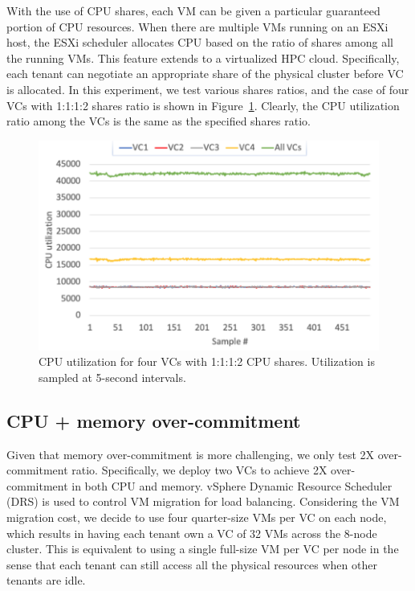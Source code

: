 With the use of CPU shares, each VM can be given a particular guaranteed portion of CPU resources. When there are multiple VMs running on an ESXi host, the ESXi scheduler allocates CPU based on the ratio of shares among all the running VMs. This feature extends to a virtualized HPC cloud. Specifically, each tenant can negotiate an appropriate share of the physical cluster before VC is allocated. In this experiment, we test various shares ratios, and the case of four VCs with 1:1:1:2 shares ratio is shown in Figure~\ref{fig:share_utilization}. Clearly, the CPU utilization ratio among the VCs is the same as the specified shares ratio. %


\begin{figure}[!t]
   \begin{center}
       \includegraphics[width=0.8\columnwidth]{Figures/share_utilization.pdf}
   \end{center}
   \caption{CPU utilization for four VCs with 1:1:1:2 CPU shares. Utilization is sampled at 5-second intervals.}
   \label{fig:share_utilization}
 \end{figure}







\subsection{CPU + memory over-commitment}
Given that memory over-commitment is more challenging, 
we only test 2X over-commitment ratio. Specifically, 
we deploy two VCs to achieve 2X over-commitment in both CPU and memory. 
vSphere Dynamic Resource Scheduler (DRS) is used to control VM migration for load balancing. 
Considering the VM migration cost, we decide to use four quarter-size VMs per VC on each node, which results in having each tenant own a VC of 32 VMs across the 8-node cluster. 
This is equivalent to using a single full-size VM per VC per node in the sense that each tenant can still access all the physical resources when other tenants are idle. 

